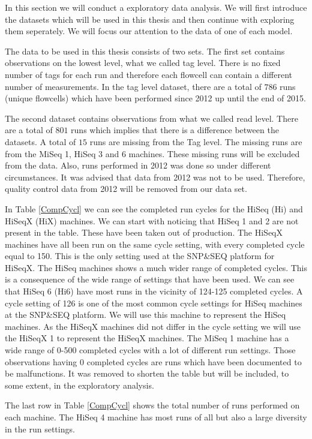 \documentclass[a4paper,11pt,fleqn,twoside,notitlepage]{report}\usepackage[]{graphicx}\usepackage[]{color}
\begin{document}
In this section we will conduct a exploratory data analysis. We will first introduce the datasets which will be used in this thesis and then continue with exploring them seperately. We will focus our attention to the data of one of each model. 

The data to be used in this thesis consists of two sets. The first set contains observations on the lowest level, what we called tag level. There is no fixed number of tags for each run and therefore each flowcell can contain a different number of measurements. In the tag level dataset, there are a total of $786$ runs (unique flowcells) which have been performed since 2012 up until the end of 2015. 

The second dataset contains observations from what we called read level. There are a total of $801$ runs which implies that there is a difference between the datasets. A total of $15$ runs are missing from the Tag level. The missing runs are from the MiSeq 1, HiSeq 3 and 6 machines. These missing runs will be excluded from the data. Also, runs performed in 2012 was done so under different circumstances. It was advised that data from 2012 was not to be used. Therefore, quality control data from 2012 will be removed from our data set.

In Table \ref{CompCycl} we can see the completed run cycles for the HiSeq (Hi) and HiSeqX (HiX) machines. We can start with noticing that HiSeq 1 and 2 are not present in the table. These have been taken out of production. The HiSeqX machines have all been run on the same cycle setting, with every completed cycle equal to 150. This is the only setting used at the SNP\&SEQ platform for HiSeqX. The HiSeq machines shows a much wider range of completed cycles. This is a consequence of the wide range of settings that have been used. We can see that HiSeq 6 (Hi6) have most runs in the vicinity of 124-125 completed cycles. A cycle setting of 126 is one of the most common cycle settings for HiSeq machines at the SNP\&SEQ platform. We will use this machine to represent the HiSeq machines. As the HiSeqX machines did not differ in the cycle setting we will use the HiSeqX 1 to represent the HiSeqX machines. The MiSeq 1 machine has a wide range of 0-500 completed cycles with a lot of different run settings. Those observations having 0 completed cycles are runs which have been documented to be malfunctions. It was removed to shorten the table but will be included, to some extent, in the exploratory analysis.

The last row in Table \ref{CompCycl} shows the total number of runs performed on each machine. The HiSeq 4 machine has most runs of all but also a large diversity in the run settings. 
\end{document}
